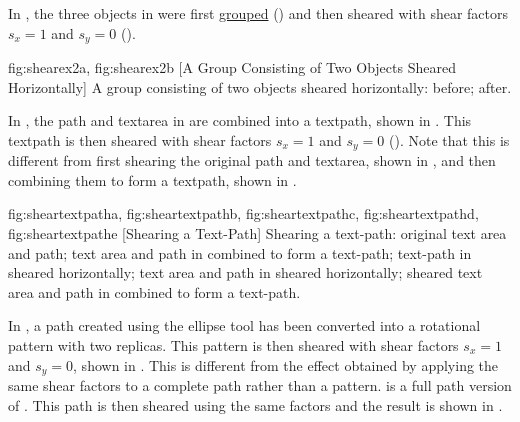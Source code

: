 In , the three objects in
 were first \hyperref[sec:grouping]{grouped}
() and then sheared with shear factors
$s_x=1$ and $s_y=0$ ().

{
 {fig:shearex2a}{}{},
 {fig:shearex2b}{}{}
}
[A Group Consisting of Two Objects Sheared Horizontally]
{A group consisting of two objects sheared horizontally:
 before;
 after.}

In , the \gls*{path} and
\gls*{textarea} in  are combined into
a \gls*{textpath}, shown in . This
\gls*{textpath} is then sheared with shear factors $s_x=1$ and
$s_y=0$ (). Note that this is
different from first shearing the original \gls*{path} and
\gls*{textarea}, shown in , and then
combining them to form a \gls*{textpath}, shown in
.

{
 {fig:sheartextpatha}{}{},
 {fig:sheartextpathb}{}{},
 {fig:sheartextpathc}{}{},
 {fig:sheartextpathd}{}{},
 {fig:sheartextpathe}{}{}
}
[Shearing a Text-Path]
{Shearing a text-path:
 original text area and path; 
 text area and path 
in  combined to form a text-path; 
 text-path 
in  sheared horizontally; 
 text area and path 
in  sheared horizontally; 
 sheared text area and path 
in  combined to form a text-path.}

In , a \gls*{path} created using the
ellipse tool has been converted into a rotational pattern with two
replicas. This pattern is then sheared with shear factors $s_x=1$
and $s_y=0$, shown in . This is
different from the effect obtained by applying the same shear
factors to a complete path rather than a pattern.
 is a full path version of
. This path is then sheared using the
same factors and the result is shown in
.

